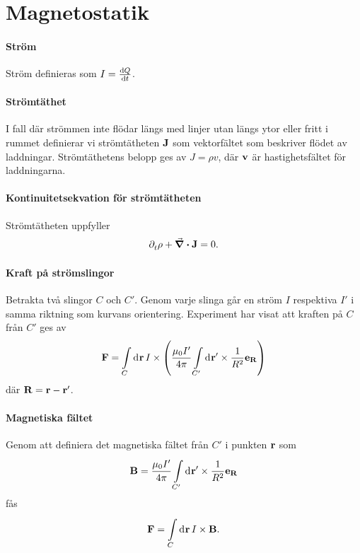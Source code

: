 \section{Magnetostatik}

\paragraph{Ström}
Ström definieras som $I = \dv{Q}{t}$.

\paragraph{Strömtäthet}
I fall där strömmen inte flödar längs med linjer utan längs ytor eller fritt i rummet definierar vi strömtätheten $\vb{J}$ som vektorfältet som beskriver flödet av laddningar. Strömtäthetens belopp ges av $J = \rho v$, där $\vb{v}$ är hastighetsfältet för laddningarna.

\paragraph{Kontinuitetsekvation för strömtätheten}
Strömtätheten uppfyller
\begin{align*}
	\partial_{t}^{}\rho + \div{\vb{J}} = 0.
\end{align*}

\paragraph{Kraft på strömslingor}
Betrakta två slingor $C$ och $C'$. Genom varje slinga går en ström $I$ respektiva $I'$ i samma riktning som kurvans orientering. Experiment har visat att kraften på $C$ från $C'$ ges av
\begin{align*}
	\vb{F} = \int\limits_{C}^{}\dd[]{\vb{r}}I\times\left(\frac{\mu_{0}I'}{4\pi}\int\limits_{C'}^{}\dd[]{\vb{r}'}\times\frac{1}{R^{2}}\vb{e}_{\vb{R}}\right)
\end{align*}
där $\vb{R} = \vb{r} - \vb{r}'$.

\paragraph{Magnetiska fältet}
Genom att definiera det magnetiska fältet från $C'$ i punkten $\vb{r}$ som
\begin{align*}
	\vb{B} = \frac{\mu_{0}I'}{4\pi}\int\limits_{C'}^{}\dd[]{\vb{r}'}\times\frac{1}{R^{2}}\vb{e}_{\vb{R}}
\end{align*}
fås
\begin{align*}
	\vb{F} = \int\limits_{C}^{}\dd[]{\vb{r}}I\times\vb{B}.
\end{align*}

